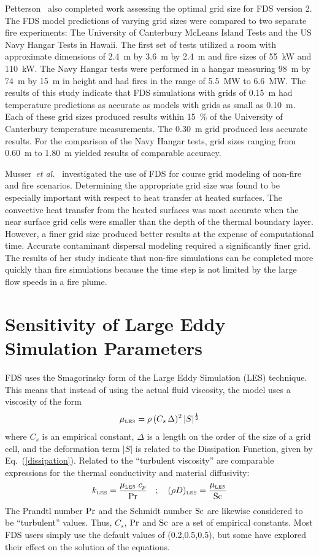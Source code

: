 \documentclass[11pt]{book}
\newcommand{\ha}{\frac{1}{2}}
\newcommand{\be}{\begin{equation}}
\newcommand{\ee}{\end{equation}}
\newcommand{\PR}{\hbox{Pr}}
\newcommand{\SC}{\hbox{Sc}}
\begin{document}
Petterson~\cite{Petterson:1} also completed work assessing the optimal
grid size for FDS version 2. The FDS model predictions of varying grid
sizes were  compared to two separate fire  experiments: The University
of Canterbury  McLeans Island  Tests and the  US Navy Hangar  Tests in
Hawaii.  The first  set  of  tests utilized  a  room with  approximate
dimensions of  2.4~m by  3.6~m by  2.4~m and fire  sizes of  55~kW and
110~kW. The  Navy Hangar  tests were performed  in a  hangar measuring
98~m by 74~m by 15~m in height and had fires in the range of 5.5~MW to
6.6~MW. The results  of this study indicate that  FDS simulations with
grids of 0.15~m had temperature predictions as accurate as models with
grids as  small as 0.10~m. Each  of these grid  sizes produced results
within   15~\%   of   the   University   of   Canterbury   temperature
measurements. The 0.30~m grid  produced less accurate results. For the
comparison of the Navy Hangar tests, grid sizes ranging from 0.60~m to
1.80~m yielded results of comparable accuracy.

Musser~{\em et  al.}~\cite{Musser:1} investigated  the use of  FDS for
course grid  modeling of non-fire and fire  scenarios. Determining the
appropriate  grid  size was  found  to  be  especially important  with
respect  to heat  transfer  at heated  surfaces.  The convective  heat
transfer  from the  heated surfaces  was most  accurate when  the near
surface grid cells were smaller than the depth of the thermal boundary
layer.  However, a  finer grid  size  produced better  results at  the
expense of computational time. Accurate contaminant dispersal modeling
required a significantly finer grid. The results of her study indicate
that  non-fire simulations  can be  completed more  quickly  than fire
simulations because  the time  step is not  limited by the  large flow
speeds in a fire plume.


\section{Sensitivity of Large Eddy Simulation Parameters}

FDS  uses the  Smagorinsky form  of  the Large  Eddy Simulation  (LES)
technique.  This  means  that   instead  of  using  the  actual  fluid
viscosity, the model uses a viscosity of the form \be \mu_{\hbox{\tiny
LES}} =  \rho \,  (C_s\, \Delta)^2  \, |S|^\ha \ee  where $C_s$  is an
empirical constant, $\Delta$ is a length on the order of the size of a
grid  cell,  and  the  deformation   term  $|S|$  is  related  to  the
Dissipation Function, given by Eq.~(\ref{dissipation}). Related to the
``turbulent  viscosity'' are  comparable expressions  for  the thermal
conductivity  and  material diffusivity:  \be  k_{\hbox{\tiny LES}}  =
\frac{\mu_{\hbox{\tiny  LES}}   \;  c_p}{\PR}  \quad   ;  \quad  (\rho
D)_{\hbox{\tiny  LES}}  =\frac{\mu_{\hbox{\tiny  LES}}}{\SC}  \ee  The
Prandtl  number  $\PR$  and  the  Schmidt number  $\SC$  are  likewise
considered to  be ``turbulent'' values.  Thus, $C_s$, $\PR$  and $\SC$
are  a set  of  empirical constants.  Most  FDS users  simply use  the
default values  of (0.2,0.5,0.5), but some have  explored their effect
on the solution of the equations.
\end{document}
